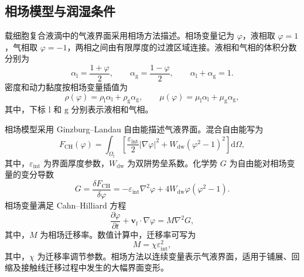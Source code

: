 \subsection{相场模型与润湿条件}
\label{subsec:ch2_phase_field}

载细胞复合液滴中的气液界面采用相场方法描述。相场变量记为 $\varphi$，液相取 $\varphi=1$，气相取 $\varphi=-1$，两相之间由有限厚度的过渡区域连接。液相和气相的体积分数分别为
\begin{equation}
\alpha_{\mathrm l}=\frac{1+\varphi}{2},
\qquad
\alpha_{\mathrm g}=\frac{1-\varphi}{2},
\qquad
\alpha_{\mathrm l}+\alpha_{\mathrm g}=1.
\label{eq:ch2_phase_fraction}
\end{equation}
密度和动力黏度按相场变量插值为
\begin{equation}
\rho(\varphi)
=
\rho_{\mathrm l}\alpha_{\mathrm l}
+
\rho_{\mathrm g}\alpha_{\mathrm g},
\qquad
\mu(\varphi)
=
\mu_{\mathrm l}\alpha_{\mathrm l}
+
\mu_{\mathrm g}\alpha_{\mathrm g},
\label{eq:ch2_phase_properties}
\end{equation}
其中，下标 $\mathrm l$ 和 $\mathrm g$ 分别表示液相和气相。

相场模型采用 Ginzburg--Landau 自由能描述气液界面。混合自由能写为
\begin{equation}
F_{\mathrm{CH}}(\varphi)
=
\int_{\Omega_{\mathrm f}}
\left[
\frac{\varepsilon_{\mathrm{int}}}{2}
\left|\nabla\varphi\right|^2
+
W_{\mathrm{dw}}
\left(\varphi^2-1\right)^2
\right]
\mathrm d\Omega,
\label{eq:ch2_phase_free_energy}
\end{equation}
其中，$\varepsilon_{\mathrm{int}}$ 为界面厚度参数，$W_{\mathrm{dw}}$ 为双阱势垒系数。化学势 $G$ 为自由能对相场变量的变分导数
\begin{equation}
G
=
\frac{\delta F_{\mathrm{CH}}}{\delta\varphi}
=
-\varepsilon_{\mathrm{int}}\nabla^2\varphi
+
4W_{\mathrm{dw}}\varphi\left(\varphi^2-1\right).
\label{eq:ch2_phase_auxiliary}
\end{equation}
相场变量满足 Cahn--Hilliard 方程
\begin{equation}
\frac{\partial\varphi}{\partial t}
+
\boldsymbol{v}_{\mathrm f}\cdot\nabla\varphi
=
M\nabla^2G,
\label{eq:ch2_cahn_hilliard}
\end{equation}
其中，$M$ 为相场迁移率。数值计算中，迁移率可写为
\begin{equation}
M
=
\chi\varepsilon_{\mathrm{int}}^2,
\label{eq:ch2_phase_mobility}
\end{equation}
其中，$\chi$ 为迁移率调节参数。相场方法以连续变量表示气液界面，适用于铺展、回缩及接触线迁移过程中发生的大幅界面变形\cite{anderson1998diffuseinterface,jacqmin1999phasefield,badalassi2003phasefield,yue2004diffuseinterface}。

